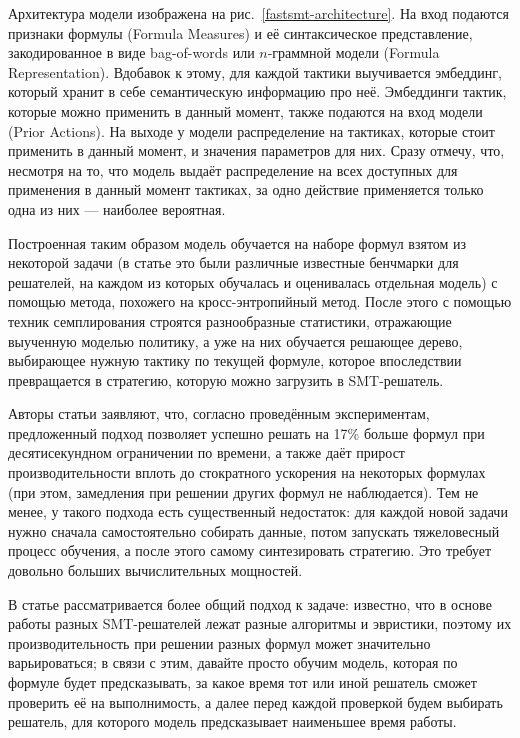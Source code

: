 Архитектура модели изображена на рис.~\ref{fastsmt-architecture}. На вход подаются признаки формулы (Formula Measures) и её синтаксическое представление, закодированное в виде bag-of-words или $n$-граммной модели (Formula Representation). Вдобавок к этому, для каждой тактики выучивается эмбеддинг, который хранит в себе семантическую информацию про неё. Эмбеддинги тактик, которые можно применить в данный момент, также подаются на вход модели (Prior Actions). На выходе у модели распределение на тактиках, которые стоит применить в данный момент, и значения параметров для них. Сразу отмечу, что, несмотря на то, что модель выдаёт распределение на всех доступных для применения в данный момент тактиках, за одно действие применяется только одна из них --- наиболее вероятная.

Построенная таким образом модель обучается на наборе формул взятом из некоторой задачи (в статье это были различные известные бенчмарки для решателей, на каждом из которых обучалась и оценивалась отдельная модель) с помощью метода, похожего на кросс-энтропийный метод. После этого с помощью техник семплирования строятся разнообразные статистики, отражающие выученную моделью политику, а уже на них обучается решающее дерево, выбирающее нужную тактику по текущей формуле, которое впоследствии превращается в стратегию, которую можно загрузить в SMT-решатель.

Авторы статьи заявляют, что, согласно проведённым экспериментам, предложенный подход позволяет успешно решать на 17\% больше формул при десятисекундном ограничении по времени, а также даёт прирост производительности вплоть до стократного ускорения на некоторых формулах (при этом, замедления при решении других формул не наблюдается). Тем не менее, у такого подхода есть существенный недостаток: для каждой новой задачи нужно сначала самостоятельно собирать данные, потом запускать тяжеловесный процесс обучения, а после этого самому синтезировать стратегию. Это требует довольно больших вычислительных мощностей.

 \label{gnn-for-scheduling-of-smt-solvers}

В статье \cite{gnn-for-scheduling-paper} рассматривается более общий подход к задаче: известно, что в основе работы разных SMT-решателей лежат разные алгоритмы и эвристики, поэтому их производительность при решении разных формул может значительно варьироваться; в связи с этим, давайте просто обучим модель, которая по формуле будет предсказывать, за какое время тот или иной решатель сможет проверить её на выполнимость, а далее перед каждой проверкой будем выбирать решатель, для которого модель предсказывает наименьшее время работы.

